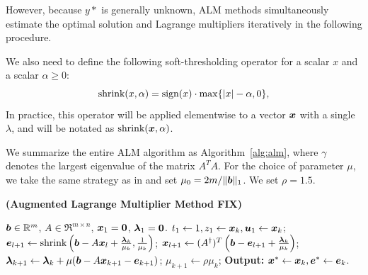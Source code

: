 \documentclass[10pt,twocolumn,letterpaper]{article}
\begin{document}
However, because $y*$ is generally unknown, ALM methods simultaneously estimate the optimal solution and Lagrange multipliers iteratively in the following procedure.

We also need to define the following soft-thresholding operator for a
scalar $x$ and a scalar $\alpha \geq 0$:
\begin{equation}
\textup{shrink}(x,\alpha) = \textup{sign}(x)\cdot \max \{|x| - \alpha, 0\},
\end{equation}
In practice, this operator will be applied elementwise to a vector ${\boldsymbol{x}}$ with a single $\lambda$,
and will be notated as $\textup{shrink}({\boldsymbol{x}},\alpha)$.

We summarize the entire ALM
algorithm as Algorithm~\ref{alg:alm}, where $\gamma$ denotes the largest eigenvalue of the matrix $A^TA$. For the choice of parameter $\mu$, we take the same strategy as
in \cite{YangJ2009-pp} and set $\mu_0 = 2m / \|\boldsymbol{b}\|_1$. We set $\rho=1.5$.
\begin{algorithm}[h]
\caption{\bf (Augmented Lagrange Multiplier Method FIX)}
\begin{algorithmic}[1]
 $\boldsymbol{b} \in \mathbb R^m$, $A \in \Re^{m \times n}$,
${\boldsymbol{x}}_1 = \boldsymbol{0}$, $\boldsymbol{\lambda}_1 = \boldsymbol{0}$.
\STATE $t_{1} \leftarrow 1, z_{1} \leftarrow {\boldsymbol{x}}_{k}, \boldsymbol{u}_{1} \leftarrow {\boldsymbol{x}}_{k}$;
\STATE $\boldsymbol{e}_{l+1} \leftarrow \textup{shrink}\left(\boldsymbol{b} - A{\boldsymbol{x}}_l + \frac{\boldsymbol{\lambda}_k}{\mu_k}, \frac{1}{\mu_k}\right)$;
\STATE ${\boldsymbol{x}}_{l+1} \leftarrow (A^\dagger)^T \left(\boldsymbol{b} - \boldsymbol{e}_{l+1} + \frac{\boldsymbol{\lambda}_k}{\mu_k} \right) $;
\ENDWHILE
\STATE $\boldsymbol{\lambda}_{k+1} \leftarrow \boldsymbol{\lambda}_k + \mu (\boldsymbol{b} - A{\boldsymbol{x}}_{k+1} - \boldsymbol{e}_{k+1})$;
\STATE $\mu_{k+1} \leftarrow \rho\mu_k$;
\ENDWHILE \STATE
{\bf Output:} ${\boldsymbol{x}}^* \leftarrow {\boldsymbol{x}}_k, \boldsymbol{e}^* \leftarrow \boldsymbol{e}_k$.
\end{algorithmic}
\label{alg:alm}
\end{algorithm}


\end{document}
